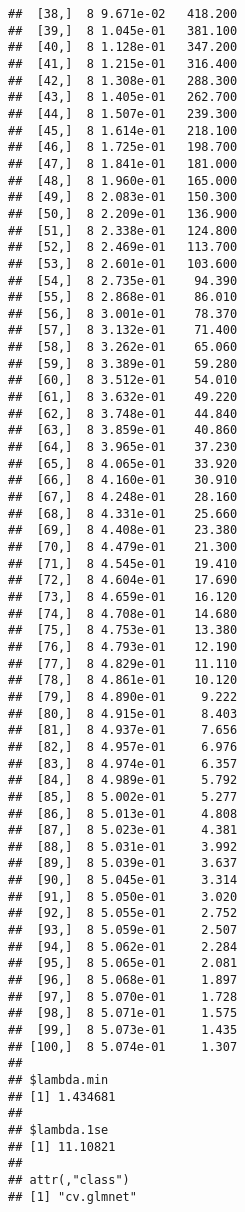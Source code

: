 \documentclass[]{article}
\newenvironment{Shaded}{\begin{snugshade}}{\end{snugshade}}
\newcommand{\OperatorTok}[1]{\textcolor[rgb]{0.81,0.36,0.00}{\textbf{#1}}}
\newcommand{\NormalTok}[1]{#1}
\begin{document}
\begin{verbatim}
##  [38,]  8 9.671e-02   418.200
##  [39,]  8 1.045e-01   381.100
##  [40,]  8 1.128e-01   347.200
##  [41,]  8 1.215e-01   316.400
##  [42,]  8 1.308e-01   288.300
##  [43,]  8 1.405e-01   262.700
##  [44,]  8 1.507e-01   239.300
##  [45,]  8 1.614e-01   218.100
##  [46,]  8 1.725e-01   198.700
##  [47,]  8 1.841e-01   181.000
##  [48,]  8 1.960e-01   165.000
##  [49,]  8 2.083e-01   150.300
##  [50,]  8 2.209e-01   136.900
##  [51,]  8 2.338e-01   124.800
##  [52,]  8 2.469e-01   113.700
##  [53,]  8 2.601e-01   103.600
##  [54,]  8 2.735e-01    94.390
##  [55,]  8 2.868e-01    86.010
##  [56,]  8 3.001e-01    78.370
##  [57,]  8 3.132e-01    71.400
##  [58,]  8 3.262e-01    65.060
##  [59,]  8 3.389e-01    59.280
##  [60,]  8 3.512e-01    54.010
##  [61,]  8 3.632e-01    49.220
##  [62,]  8 3.748e-01    44.840
##  [63,]  8 3.859e-01    40.860
##  [64,]  8 3.965e-01    37.230
##  [65,]  8 4.065e-01    33.920
##  [66,]  8 4.160e-01    30.910
##  [67,]  8 4.248e-01    28.160
##  [68,]  8 4.331e-01    25.660
##  [69,]  8 4.408e-01    23.380
##  [70,]  8 4.479e-01    21.300
##  [71,]  8 4.545e-01    19.410
##  [72,]  8 4.604e-01    17.690
##  [73,]  8 4.659e-01    16.120
##  [74,]  8 4.708e-01    14.680
##  [75,]  8 4.753e-01    13.380
##  [76,]  8 4.793e-01    12.190
##  [77,]  8 4.829e-01    11.110
##  [78,]  8 4.861e-01    10.120
##  [79,]  8 4.890e-01     9.222
##  [80,]  8 4.915e-01     8.403
##  [81,]  8 4.937e-01     7.656
##  [82,]  8 4.957e-01     6.976
##  [83,]  8 4.974e-01     6.357
##  [84,]  8 4.989e-01     5.792
##  [85,]  8 5.002e-01     5.277
##  [86,]  8 5.013e-01     4.808
##  [87,]  8 5.023e-01     4.381
##  [88,]  8 5.031e-01     3.992
##  [89,]  8 5.039e-01     3.637
##  [90,]  8 5.045e-01     3.314
##  [91,]  8 5.050e-01     3.020
##  [92,]  8 5.055e-01     2.752
##  [93,]  8 5.059e-01     2.507
##  [94,]  8 5.062e-01     2.284
##  [95,]  8 5.065e-01     2.081
##  [96,]  8 5.068e-01     1.897
##  [97,]  8 5.070e-01     1.728
##  [98,]  8 5.071e-01     1.575
##  [99,]  8 5.073e-01     1.435
## [100,]  8 5.074e-01     1.307
## 
## $lambda.min
## [1] 1.434681
## 
## $lambda.1se
## [1] 11.10821
## 
## attr(,"class")
## [1] "cv.glmnet"
\end{verbatim}

\begin{Shaded}
\end{Shaded}
\end{document}
